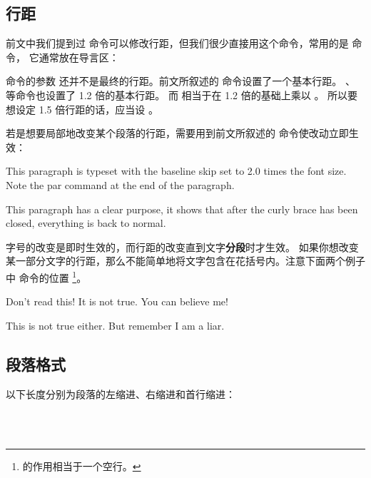 \subsection{行距}\label{subsec:linespread}

前文中我们提到过  命令可以修改行距，但我们很少直接用这个命令，常用的是 命令，
它通常放在导言区：
\begin{command}
\end{command}

 命令的参数  还并不是最终的行距。前文所叙述的  命令设置了一个基本行距。
、 等命令也设置了 1.2 倍的基本行距。
而  相当于在 1.2 倍的基础上乘以 。
所以要想设定 1.5 倍行距的话，应当设  。

若是想要局部地改变某个段落的行距，需要用到前文所叙述的  命令使改动立即生效：
\begin{example}
{\linespread{1.67}\selectfont
This paragraph is typeset with
the baseline skip set to 2.0 times
the font size. Note the par
command at the end of the
paragraph.\par}

This paragraph has a clear
purpose, it shows that after the
curly brace has been closed,
everything is back to normal.
\end{example}

字号的改变是即时生效的，而行距的改变直到文字\textbf{分段}时才生效。
如果你想改变某一部分文字的行距，那么不能简单地将文字包含在花括号内。注意下面两个例子中 命令的位置%
\footnote{ 的作用相当于一个空行。}。
\begin{example}
{\Large Don't read this!
 It is not true.
 You can believe me!\par}
\end{example}

\begin{example}
{\Large This is not true either.
But remember I am a liar.}\par
\end{example}

\subsection{段落格式}\label{subsec:par-shape}

以下长度分别为段落的左缩进、右缩进和首行缩进：
\begin{command}
\marg*{20pt}  \\
\marg*{20pt} \\
\marg*{2em}
\end{command}


